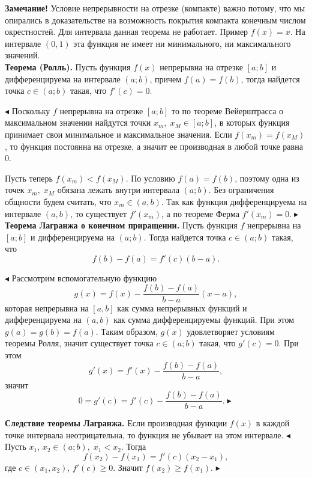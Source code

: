 \documentclass[12pt]{article}
\begin{document}
\textbf{Замечание!} Условие непрерывности на отрезке (компакте) важно потому, что мы опирались в доказательстве на возможность покрытия компакта конечным числом окрестностей. Для интервала данная теорема не работает. Пример $f(x) = x$. На интервале $(0,1)$ эта функция не имеет ни минимального, ни максимального значений.  \\


\textbf{Теорема (Ролль).} Пусть функция $f(x)$ непрерывна на отрезке $[a;b]$ и дифференцируема на интервале $(a;b)$, причем $f(a) = f(b)$, тогда найдется точка $c \in (a;b)$ такая, что $f'(c) = 0$.

$\blacktriangleleft$ Поскольку $f$ непрерывна на отрезке $[a;b]$ то по теореме Вейерштрасса о максимальном значении найдутся точки $x_m, \; x_M \in [a;b]$, в которых функция принимает свои минимальное и максимальное значения. Если $f(x_m) = f(x_M)$, то функция постоянна на отрезке, а значит ее производная в любой точке равна 0.

Пусть теперь $f(x_m) < f(x_M)$. По условию $f(a) = f(b)$, поэтому одна из точек $x_m, \; x_M$ обязана лежать внутри интервала $(a;b)$. Без ограничения общности будем считать, что $x_m \in (a,b)$. Так как функция дифференцируема на интервале $(a,b)$, то существует $f'(x_m)$, а по теореме Ферма $f'(x_m) = 0. \blacktriangleright$ \\

\textbf{Теорема Лагранжа о конечном приращении.} Пусть функция $f$ непрерывна на $[a;b]$ и дифференцируема на $(a;b)$. Тогда найдется точка $c \in (a;b)$ такая, что
$$
	f(b) - f(a) = f'(c)(b-a).
$$

$\blacktriangleleft$ Рассмотрим вспомогательную функцию 
$$
	g(x) = f(x) - \frac{f(b) - f(a)}{b-a}(x-a),
$$
которая непрерывна на $[a,b]$ как сумма непрерывных функций и дифференцируема на $(a,b)$ как сумма дифференцируемы функций. При этом $g(a) = g(b) = f(a)$. Таким образом, $g(x)$ удовлетворяет условиям теоремы Ролля, значит существует точка $c \in (a;b)$ такая, что $g'(c) = 0$. При этом
$$
g'(x) = f'(x) - \frac{f(b) - f(a)}{b-a},
$$
значит 
$$
0 = g'(c) = f'(c) - \frac{f(b) - f(a)}{b-a}. \blacktriangleright
$$

\textbf{Следствие теоремы Лагранжа.} Если производная функции $f(x)$ в каждой точке интервала неотрицательна, то функция не убывает на этом интервале. $\blacktriangleleft$ Пусть $x_1, \, x_2 \in (a;b), \; x_1 < x_2$. Тогда 
$$	
f(x_2) - f(x_1) = f'(c)(x_2 - x_1),
$$
где $c \in (x_1, x_2)$, $f'(c) \geq 0$. Значит $f(x_2) \geq f(x_1)$.
$\blacktriangleright$
\end{document}
